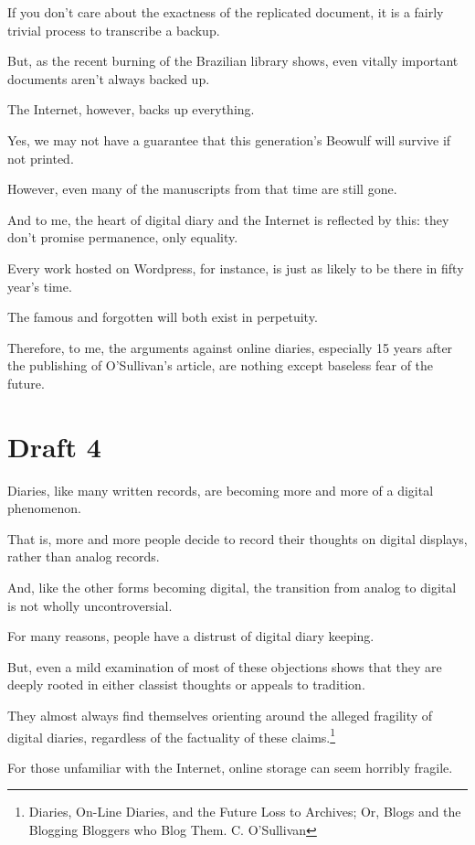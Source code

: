 \documentclass[12pt]{article}[titlepage]
\newcommand{\1}{\={a}}
\newcommand{\2}{\={e}}
\newcommand{\3}{\={\i}}
\newcommand{\4}{\=o}
\newcommand{\5}{\=u}
\newcommand{\6}{\={A}}
\renewcommand{\,}{\textsuperscript{,}}
\begin{document}
If you don’t care about the exactness of the replicated document, it is a fairly trivial process to transcribe a backup.

But, as the recent burning of the Brazilian library shows, even vitally important documents aren’t always backed up.


The Internet, however, backs up everything.

Yes, we may not have a guarantee that this generation’s Beowulf will survive if not printed.

However, even many of the manuscripts from that time are still gone.


And to me, the heart of digital diary and the Internet is reflected by this: they don’t promise permanence, only equality.

Every work hosted on Wordpress, for instance, is just as likely to be there in fifty year’s time.

The famous and forgotten will both exist in perpetuity.

Therefore, to me, the arguments against online diaries, especially 15 years after the publishing of O’Sullivan’s article, are nothing except baseless fear of the future.


\section{Draft 4}

Diaries, like many written records, are becoming more and more of a digital phenomenon.

That is, more and more people decide to record their thoughts on digital displays, rather than analog records.

And, like the other forms becoming digital, the transition from analog to digital is not wholly uncontroversial.


For many reasons, people have a distrust of digital diary keeping.

But, even a mild examination of most of these objections shows that they are deeply rooted in either classist thoughts or appeals to tradition.

They almost always find themselves orienting around the alleged fragility of digital diaries, regardless of the factuality of these claims.\footnote{Diaries, On-Line Diaries, and the Future Loss to Archives; Or, Blogs and the Blogging Bloggers who Blog Them. C. O’Sullivan}


For those unfamiliar with the Internet, online storage can seem horribly fragile.
\end{document}
